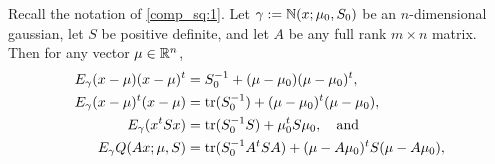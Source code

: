\documentclass[12pt,leqno]{article}
\begin{document}
  \begin{Lem}\label{exp_log}
    Recall the notation of \eqref{comp_sq:1}. Let $\gamma := {\mathbb N}(x;\mu_0,S_0)$ be an $n$-dimensional gaussian,  let $S$ be
    positive definite, and let $A$ be any
    full rank $m\times{n}$ matrix. Then for any vector $\mu\in{\mathbb R}^n$, 
    \begin{align}
      E_{\gamma}(x-\mu)(x-\mu)^t &= S_0^{-1} + (\mu-\mu_0)(\mu-\mu_0)^t, \label{E_xx^t}\\
      E_{\gamma}(x-\mu)^t(x - \mu) &=  \text{\rm tr}(S_0^{-1}) + (\mu-\mu_0)^t(\mu-\mu_0), \label{E_x^tx}\\
      E_{\gamma}(x^tSx) &= \text{\rm tr}(S_0^{-1}S) + \mu_0^tS\mu_0, \quad\text{and} \label{E_x^tSx} \\
      E_{\gamma}{Q}(Ax;\mu,S) &=  \text{\rm tr}(S_0^{-1}A^tSA) + (\mu-A\mu_0)^tS(\mu-A\mu_0), \label{E_Q}
    \end{align}
  \end{Lem}
\end{document}
